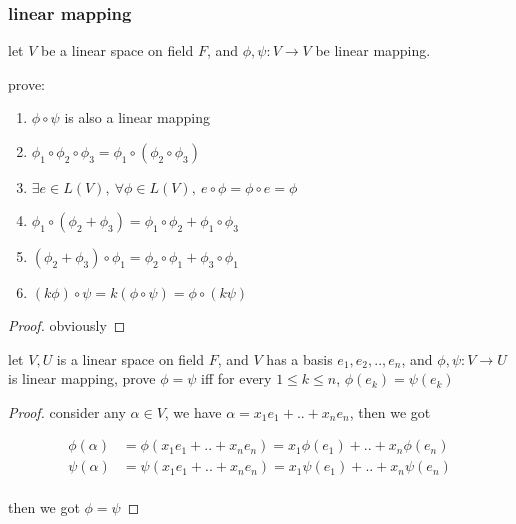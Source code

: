\subsubsection{linear mapping}

\begin{exercise}
    let $V$ be a linear space on field $F$, and $\phi, \psi: V \to V$ be linear mapping. 

    prove:

    \begin{enumerate}
        \item $\phi \circ \psi$ is also a linear mapping

        \item $\phi_1 \circ \phi_2 \circ \phi_3 = \phi_1 \circ (\phi_2 \circ \phi_3)$

        \item $\exists e \in L(V),\: \forall \phi \in L(V),\: e \circ \phi = \phi \circ e = \phi$

        \item $\phi_1 \circ( \phi_2 + \phi_3) = \phi_1 \circ \phi_2 + \phi_1 \circ \phi_3$
        \item $( \phi_2 + \phi_3) \circ \phi_1 = \phi_2 \circ \phi_1 + \phi_3 \circ \phi_1$

        \item $(k \phi) \circ \psi = k(\phi \circ \psi) = \phi \circ(k \psi)$
    \end{enumerate}
\end{exercise}

\begin{proof}
    obviously
\end{proof}

\begin{exercise}
    let $V, U$ is a linear space on field $F$, and $V$ has a basis $e_1,e_2,..,e_n$, and $\phi, \psi: V \to U$
    is linear mapping, prove $\phi = \psi $ iff for every $1 \le k \le n$,
    $\phi(e_k) = \psi(e_k)$
\end{exercise}

\begin{proof}
    consider any $\alpha \in V$, we have $\alpha = x_1e_1 + .. + x_ne_n$, then we got

    \begin{align*}
        \phi(\alpha) &= \phi(x_1e_1 + .. + x_ne_n) = x_1\phi(e_1) + .. + x_n \phi(e_n) \\
        \psi(\alpha) &= \psi(x_1e_1 + .. + x_ne_n) = x_1\psi(e_1) + .. + x_n \psi(e_n) \\
    \end{align*}

    then we got $\phi = \psi$
\end{proof}

